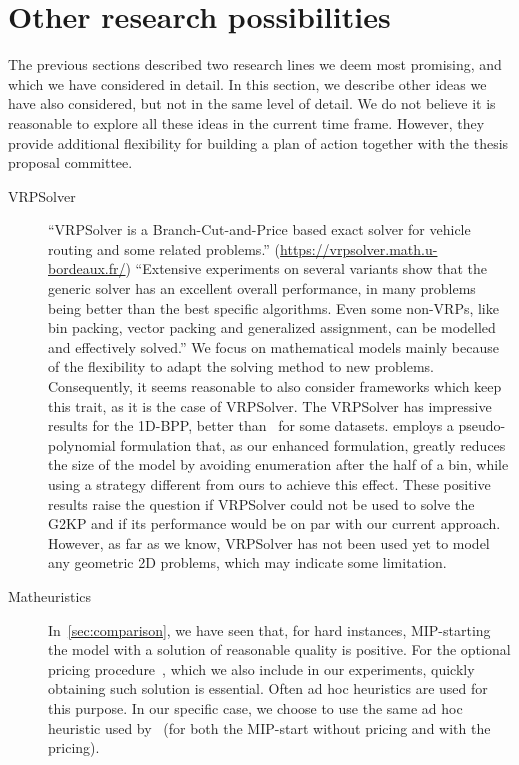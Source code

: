 \documentclass[ppgc,prop-tese,english,formais,babel]{iiufrgs}
\begin{document}
\section{Other research possibilities}
\label{sec:alternatives}

The previous sections described two research lines we deem most promising, and which we have considered in detail.
In this section, we describe other ideas we have also considered, but not in the same level of detail.
We do not believe it is reasonable to explore all these ideas in the current time frame.
However, they provide additional flexibility for building a plan of action together with the thesis proposal committee.

\begin{description}
\item[VRPSolver]
	``VRPSolver is a Branch-Cut-and-Price based exact solver for vehicle routing and some related problems.'' (\url{https://vrpsolver.math.u-bordeaux.fr/})
	``Extensive experiments on several variants show that the generic solver has an excellent overall performance, in many problems being better than the best specific algorithms. Even some non-VRPs, like bin packing, vector packing and generalized assignment, can be modelled and effectively solved.'' \citep{pessoa:2020}
	We focus on mathematical models mainly because of the flexibility to adapt the solving method to new problems.
	Consequently, it seems reasonable to also consider frameworks which keep this trait, as it is the case of VRPSolver.
	The VRPSolver has impressive results for the 1D-BPP, better than~\citet{delorme:2019} for some datasets.
	\citet{delorme:2019} employs a pseudo-polynomial formulation that, as our enhanced formulation, greatly reduces the size of the model by avoiding enumeration after the half of a bin, while using a strategy different from ours to achieve this effect.
	These positive results raise the question if VRPSolver could not be used to solve the G2KP and if its performance would be on par with our current approach.
	However, as far as we know, VRPSolver has not been used yet to model any geometric 2D problems, which may indicate some limitation.
\item[Matheuristics]
	In~\cref{sec:comparison}, we have seen that, for hard instances, MIP-starting the model with a solution of reasonable quality is positive.
	For the optional pricing procedure~\citet{furini:2016}, which we also include in our experiments, quickly obtaining such solution is essential.
	Often ad hoc heuristics are used for this purpose.
	In our specific case, we choose to use the same ad hoc heuristic used by~\citet{furini:2016} (for both the MIP-start without pricing and with the pricing).

\end{description}
\end{document}
